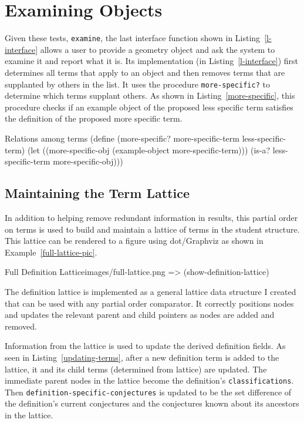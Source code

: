 \section{Examining Objects}

Given these tests, \texttt{examine}, the last interface function shown
in Listing~\ref{l-interface} allows a user to provide a geometry
object and ask the system to examine it and report what it is. Its
implementation (in Listing~\ref{l-interface}) first determines all
terms that apply to an object and then removes terms that are
supplanted by others in the list. It uses the procedure
\texttt{more-specific?} to determine which terms supplant others. As
shown in Listing~\ref{more-specific}, this procedure checks if an
example object of the proposed less specific term satisfies the
definition of the proposed more specific term.

\begin{code-listing}
[label=more-specific]
{Relations among terms}
(define (more-specific? more-specific-term less-specific-term)
  (let ((more-specific-obj (example-object more-specific-term)))
    (is-a? less-specific-term more-specific-obj)))
\end{code-listing}


\subsection{Maintaining the Term Lattice}

In addition to helping remove redundant information in results, this
partial order on terms is used to build and maintain a lattice of
terms in the student structure. This lattice can be rendered to a
figure using dot/Graphviz as shown in Example~\ref{full-lattice-pic}.

\begin{img-example}
[label=full-lattice-pic,
breakable=false,
comment style={size=fbox,frame hidden,height=8cm}]
{Full Definition Lattice}{images/full-lattice.png}
=> (show-definition-lattice)
\end{img-example}

The definition lattice is implemented as a general lattice data
structure I created that can be used with any partial order
comparator. It correctly positions nodes and updates the relevant
parent and child pointers as nodes are added and removed.

Information from the lattice is used to update the derived definition
fields. As seen in Listing~\ref{updating-terms}, after a new
definition term is added to the lattice, it and its child terms
(determined from lattice) are updated. The immediate parent nodes in
the lattice become the definition's \texttt{classifications}.  Then
\texttt{definition-specific-conjectures} is updated to be the set
difference of the definition's current conjectures and the conjectures
known about its ancestors in the lattice.

